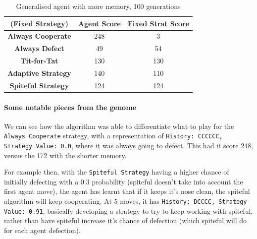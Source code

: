 \documentclass[11pt]{scrartcl} %
\begin{document}
\begin{table}[H]
    \centering
    \begin{tabular}{|c|c|c|}
        \hline
		\textbf{(Fixed Strategy)} & \textbf{Agent Score} & \textbf{Fixed Strat Score} \\ \hline
        \textbf{Always Cooperate} & 248 & 3\\ \hline
        \textbf{Always Defect} & 49 & 54 \\ \hline
        \textbf{Tit-for-Tat} & 130 & 130 \\ \hline
        \textbf{Adaptive Strategy} & 140 & 110 \\ \hline
        \textbf{Spiteful Strategy} & 124 & 124 \\ \hline
    \end{tabular}
    \caption{Generalised agent with more memory, 100 generations}
    \label{tab:gen_mem_agent_vs_fixed_strats}
\end{table}

\newpage
\paragraph{Some notable pieces from the genome}
We can see how the algorithm was able to differentiate what to play for the \texttt{Always Cooperate} strategy, 
with a representation of \texttt{History: CCCCCC, Strategy Value: 0.0}, where it was always going to defect. This had it score 248, versus the 172 with the shorter memory.

For example then, with the \texttt{Spiteful Strategy} having a higher chance of initially defecting with a 0.3 probability (spiteful doesn't take into account the first agent move), the agent has learnt that if it keeps it's nose clean, the spiteful algorithm will keep cooperating.
At 5 moves, it has \texttt{History: DCCCC, Strategy Value: 0.91}, basically developing a strategy to try to keep working with spiteful, rather than have spiteful increase it's chance of defection (which spiteful will do for each agent defection).
\end{document}
